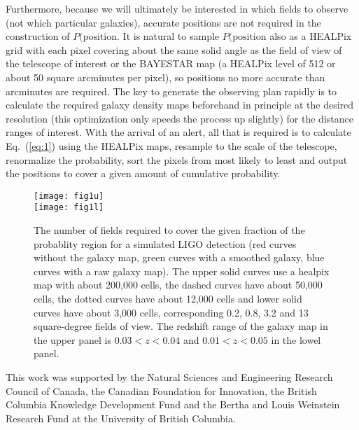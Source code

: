 \documentclass[useAMS,usenatbib]{mn2e}
\begin{document}
Furthermore, because we will ultimately be interested in which fields
to observe (not which particular galaxies), accurate positions are not
required in the construction of $P(\mathrm{position}$. It is natural
to sample $P(\mathrm{position}$ also as a HEALPix grid with each pixel
covering about the same solid angle as the field of view of the
telescope of interest or the BAYESTAR map (a HEALPix level of 512 or
about 50 square arcminutes per pixel), so positions no more accurate
than arcminutes are required.  The key to generate the observing plan
rapidly is to calculate the required galaxy density maps beforehand in
principle at the desired resolution (this optimization only speeds the
process up slightly) for the distance ranges of interest.  With the
arrival of an alert, all that is required is to calculate
Eq.~(\ref{eq:1}) using the HEALPix maps, resample to the scale of the
telescope, renormalize the probability, sort the pixels from most
likely to least and output the positions to cover a given amount of
cumulative probability.


\begin{figure}
  \texttt{[image: fig1u]} \\
  \texttt{[image: fig1l]} 
  \caption{The number of fields required to cover the given fraction
    of the probablity region for a simulated LIGO detection (red
    curves without the galaxy map, green curves with a smoothed
    galaxy, blue curves with a raw galaxy map).  The upper solid
    curves use a healpix map with about 200,000 cells, the dashed
    curves have about 50,000 cells, the dotted curves have about
    12,000 cells and lower solid curves have about 3,000 cells,
    corresponding 0.2, 0.8, 3.2 and 13 square-degree fields of
    view. The redshift range of the galaxy map in the upper panel is
    $0.03<z<0.04$ and $0.01<z<0.05$ in the lowel panel.}
\end{figure}

This work was supported by the Natural Sciences and Engineering
Research Council of Canada, the Canadian Foundation for Innovation,
the British Columbia Knowledge Development Fund and the Bertha and
Louis Weinstein Research Fund at the University of British Columbia.





\label{lastpage}
\end{document}
